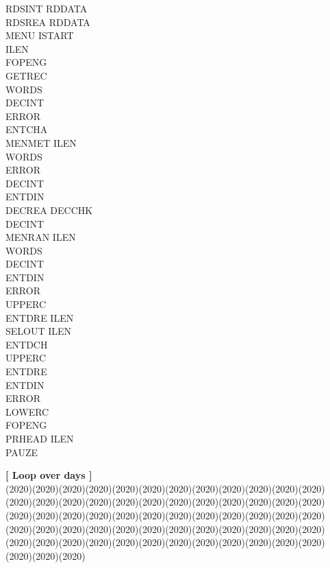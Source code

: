 \begin{tabbing}
\>\> \> \> RDSINT\> \> RDDATA\\
\>\> \> \> RDSREA\> \> RDDATA\\
\>\> \> \> MENU\> \> ISTART\\
\>\> \> \> \> \> ILEN\\
\>\> \> \> \> \> FOPENG\\
\>\> \> \> \> \> GETREC\\
\>\> \> \> \> \> WORDS\\
\>\> \> \> \> \> DECINT\\
\>\> \> \> \> \> ERROR\\
\>\> \> \> \> \> ENTCHA\\
\>\> \> \> MENMET\> \> ILEN\\
\>\> \> \> \> \> WORDS\\
\>\> \> \> \> \> ERROR\\
\>\> \> \> \> \> DECINT\\
\>\> \> \> \> \> ENTDIN\\
\>\> \> \> \> \> DECREA\> \> DECCHK\\
\>\> \> \> DECINT\\
\>\> \> \> MENRAN\> \> ILEN\\
\>\> \> \> \> \> WORDS\\
\>\> \> \> \> \> DECINT\\
\>\> \> \> \> \> ENTDIN\\
\>\> \> \> \> \> ERROR\\
\>\> \> \> UPPERC\\
\>\> \> \> ENTDRE\> \> ILEN\\
\>\> \> \> SELOUT\> \> ILEN\\
\>\> \> \> \> \> ENTDCH\\
\>\> \> \> \> \> UPPERC\\
\>\> \> \> \> \> ENTDRE\\
\>\> \> \> \> \> ENTDIN\\
\>\> \> \> \> \> ERROR\\
\>\> \> \> \> \> LOWERC\\
\>\> \> \> \> \> FOPENG\\
\>\> \> \> PRHEAD\> \> ILEN\\
\>\> \> \> PAUZE
\end{tabbing}
\strut\hfill {\bf [ Loop over days ]}\\
 \GrBox(2020)\GrBox(2020)\GrBox(2020)\GrBox(2020)\GrBox(2020)\GrBox(2020)\GrBox(2020)\GrBox(2020)\GrBox(2020)\GrBox(2020)\GrBox(2020)\GrBox(2020)\GrBox(2020)\GrBox(2020)\GrBox(2020)\GrBox(2020)\GrBox(2020)\GrBox(2020)\GrBox(2020)\GrBox(2020)\GrBox(2020)\GrBox(2020)\GrBox(2020)\GrBox(2020)\GrBox(2020)\GrBox(2020)\GrBox(2020)\GrBox(2020)\GrBox(2020)\GrBox(2020)\GrBox(2020)\GrBox(2020)\GrBox(2020)\GrBox(2020)\GrBox(2020)\GrBox(2020)\GrBox(2020)\GrBox(2020)\GrBox(2020)\GrBox(2020)\GrBox(2020)\GrBox(2020)\GrBox(2020)\GrBox(2020)\GrBox(2020)\GrBox(2020)\GrBox(2020)\GrBox(2020)\GrBox(2020)\GrBox(2020)\GrBox(2020)\GrBox(2020)\GrBox(2020)\GrBox(2020)\GrBox(2020)\GrBox(2020)\GrBox(2020)\GrBox(2020)\GrBox(2020)\GrBox(2020)\GrBox(2020)\GrBox(2020)\GrBox(2020)\nwln
